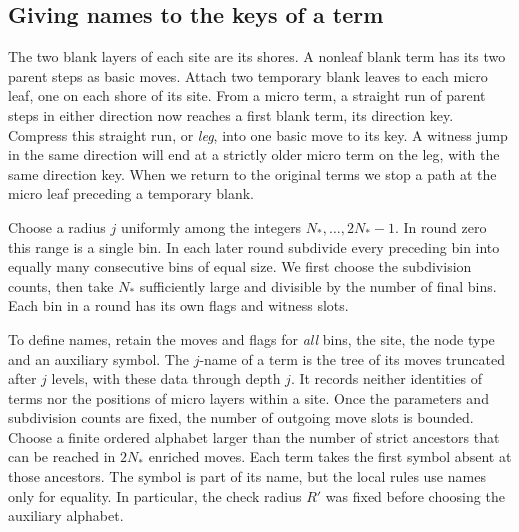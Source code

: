 \subsection{Giving names to the keys of a term}

The two blank layers of each site are its shores. A nonleaf blank term has
its two parent steps as basic moves. Attach two temporary blank leaves to
each micro leaf, one on each shore of its site. From a micro term, a
straight run of parent steps in either direction now reaches a first blank
term, its direction key. Compress this straight run, or \emph{leg}, into
one basic move to its key. A witness jump in the same direction will end
at a strictly older micro term on the leg, with the same direction key.
When we return to the original terms we stop a path at the micro leaf
preceding a temporary blank.

Choose a radius \(j\) uniformly among the integers
\(N_*,\ldots,2N_*-1\). In round zero this range is a single bin. In each
later round subdivide every preceding bin into equally many consecutive
bins of equal size. We first choose the subdivision counts, then take
\(N_*\) sufficiently large and divisible by the number of final bins.
Each bin in a round has its own flags and witness slots.

To define names, retain the moves and flags for \emph{all} bins, the site,
the node type and an auxiliary symbol. The \(j\)-name of a term is the
tree of its moves truncated after \(j\) levels, with these data through
depth \(j\). It records neither identities of terms nor the positions of
micro layers within a site. Once the parameters and subdivision counts
are fixed, the number of outgoing move slots is bounded. Choose a finite
ordered alphabet larger than the number of strict ancestors that can be
reached in \(2N_*\) enriched moves. Each term takes the first symbol
absent at those ancestors. The symbol is part of its name, but the local
rules use names only for equality. In particular, the check radius
\(R'\) was fixed before choosing the auxiliary alphabet.

